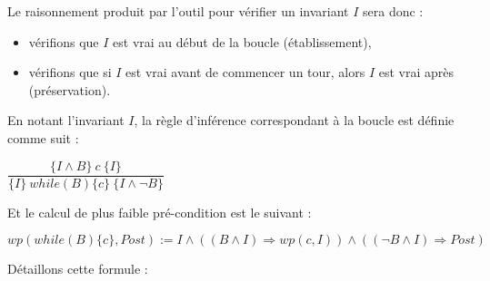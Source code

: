 Le raisonnement produit par l'outil pour vérifier un invariant $I$ sera donc :



\begin{itemize}
\item vérifions que $I$ est vrai au début de la boucle (établissement),
\item vérifions que si $I$ est vrai avant de commencer un tour, alors $I$ est vrai après (préservation).
\end{itemize}




En notant l'invariant $I$, la règle d'inférence correspondant à la boucle est 
définie comme suit :




\begin{center}
$\dfrac{\{I \wedge B \}\ c\ \{I\}}{\{I\}\ while(B)\{c\}\ \{I \wedge \neg B\}}$


\end{center}


Et le calcul de plus faible pré-condition est le suivant :




\begin{center}
$wp(while (B) \{ c \}, Post) := I \wedge ((B \wedge I) \Rightarrow wp(c, I)) \wedge ((\neg B \wedge I) \Rightarrow Post)$


\end{center}


Détaillons cette formule :



